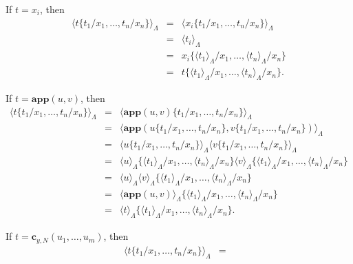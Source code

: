 \documentclass{LMCS}
\newcommand{\varone}{x}
\newcommand{\vartwo}{y}
\newcommand{\lambdatwo}{N}
\newcommand{\termone}{t}
\newcommand{\termtwo}{u}
\newcommand{\termthree}{v}
\newcommand{\appTRS}{\mathbf{app}}
\newcommand{\constr}[2]{\mathbf{c}_{#1,#2}}
\newcommand{\TRStolambda}[1]{\langle{#1}\rangle_{\Lambdaterms}}
\newcommand{\Lambdaterms}{\Lambda}
\newenvironment{varitemize}
{
\begin{list}{\labelitemi}
{\setlength{\itemsep}{0.0mm}
 \setlength{\topsep}{0.0mm}
 \setlength{\parindent}{0.0mm}
 \setlength{\parskip}{0.0mm}
 \setlength{\parsep}{0.0mm}
 \setlength{\partopsep}{0.0mm}
 \setlength{\leftmargin}{15pt}
 \setlength{\labelsep}{5pt}
 \setlength{\labelwidth}{10pt}}}
{
 \end{list} 
}
\begin{document}
\begin{varitemize}
  \item
    If $\termone=\varone_i$, then 
    \begin{eqnarray*}
      \TRStolambda{\termone\{\termone_1/\varone_1,\ldots,\termone_n/\varone_n\}}&=&
      \TRStolambda{\varone_i\{\termone_1/\varone_1,\ldots,\termone_n/\varone_n\}}\\
      &=&\TRStolambda{\termone_i}\\
      &=&\varone_i\{\TRStolambda{\termone_1}/\varone_1,\ldots,\TRStolambda{\termone_n}/\varone_n\}\\
      &=&\termone\{\TRStolambda{\termone_1}/\varone_1,\ldots,\TRStolambda{\termone_n}/\varone_n\}.
    \end{eqnarray*}
  \item
    If $\termone=\appTRS(\termtwo,\termthree)$, then
    \begin{eqnarray*}
      \TRStolambda{\termone\{\termone_1/\varone_1,\ldots,\termone_n/\varone_n\}}&=&
      \TRStolambda{\appTRS(\termtwo,\termthree)\{\termone_1/\varone_1,\ldots,\termone_n/\varone_n\}}\\
      &=&\TRStolambda{\appTRS(\termtwo\{\termone_1/\varone_1,\ldots,\termone_n/\varone_n\},
        \termthree\{\termone_1/\varone_1,\ldots,\termone_n/\varone_n\})}\\
      &=&\TRStolambda{\termtwo\{\termone_1/\varone_1,\ldots,\termone_n/\varone_n\}}
      \TRStolambda{\termthree\{\termone_1/\varone_1,\ldots,\termone_n/\varone_n\}}\\
      &=&\TRStolambda{\termtwo}\{\TRStolambda{\termone_1}/\varone_1,\ldots,\TRStolambda{\termone_n}/\varone_n\}
      \TRStolambda{\termthree}\{\TRStolambda{\termone_1}/\varone_1,\ldots,\TRStolambda{\termone_n}/\varone_n\}\\
      &=&\TRStolambda{\termtwo}\TRStolambda{\termthree}
      \{\TRStolambda{\termone_1}/\varone_1,\ldots,\TRStolambda{\termone_n}/\varone_n\}\\
      &=&\TRStolambda{\appTRS(\termtwo,\termthree)}\{\TRStolambda{\termone_1}/\varone_1,\ldots,\TRStolambda{\termone_n}/\varone_n\}\\
      &=&\TRStolambda{\termone}\{\TRStolambda{\termone_1}/\varone_1,\ldots,\TRStolambda{\termone_n}/\varone_n\}.
    \end{eqnarray*}
  \item
    If $\termone=\constr{\vartwo}{\lambdatwo}(\termtwo_{1},\ldots,\termtwo_{m})$, then
    \begin{eqnarray*}
      \TRStolambda{\termone\{\termone_1/\varone_1,\ldots,\termone_n/\varone_n\}}&=&

\end{eqnarray*}
\end{varitemize}
\end{document}
